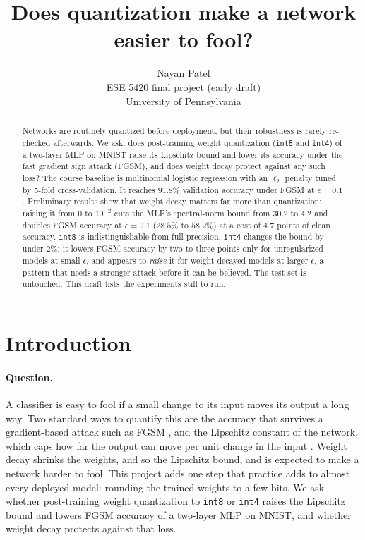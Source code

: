 \documentclass{article}
\title{Does quantization make a network easier to fool?}
\author{%
  Nayan Patel \\
  ESE 5420 final project (early draft)\\
  University of Pennsylvania
}
\newcommand{\ieight}{\texttt{int8}}
\newcommand{\ifour}{\texttt{int4}}
\begin{document}
\maketitle

\begin{abstract}
Networks are routinely quantized before deployment, but their robustness is rarely re-checked afterwards. We ask: does post-training weight quantization (\ieight{} and \ifour{}) of a two-layer MLP on MNIST raise its Lipschitz bound and lower its accuracy under the fast gradient sign attack (FGSM), and does weight decay protect against any such loss? The course baseline is multinomial logistic regression with an $\ell_2$ penalty tuned by 5-fold cross-validation. It reaches $91.8\%$ validation accuracy under FGSM at $\epsilon = 0.1$. Preliminary results show that weight decay matters far more than quantization: raising it from $0$ to $10^{-2}$ cuts the MLP's spectral-norm bound from $30.2$ to $4.2$ and doubles FGSM accuracy at $\epsilon = 0.1$ ($28.5\%$ to $58.2\%$) at a cost of $4.7$ points of clean accuracy. \ieight{} is indistinguishable from full precision. \ifour{} changes the bound by under $2\%$; it lowers FGSM accuracy by two to three points only for unregularized models at small $\epsilon$, and appears to \emph{raise} it for weight-decayed models at larger $\epsilon$, a pattern that needs a stronger attack before it can be believed. The test set is untouched. This draft lists the experiments still to run.
\end{abstract}

\section{Introduction}

\paragraph{Question.} A classifier is easy to fool if a small change to its input moves its output a long way. Two standard ways to quantify this are the accuracy that survives a gradient-based attack such as FGSM \citep{goodfellow2015explaining}, and the Lipschitz constant of the network, which caps how far the output can move per unit change in the input \citep{fazlyab2019efficient}. Weight decay shrinks the weights, and so the Lipschitz bound, and is expected to make a network harder to fool. This project adds one step that practice adds to almost every deployed model: rounding the trained weights to a few bits. We ask whether post-training weight quantization to \ieight{} or \ifour{} raises the Lipschitz bound and lowers FGSM accuracy of a two-layer MLP on MNIST, and whether weight decay protects against that loss.
\end{document}

